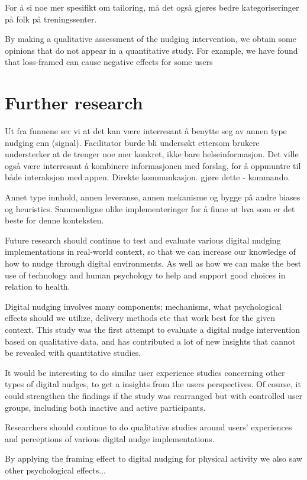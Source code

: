 For å si noe mer spesifikt om tailoring, må det også gjøres bedre kategoriseringer på folk på treningssenter. 

By making a qualitative assessment of the nudging intervention, we obtain some opinions that do not appear in a quantitative study. For example, we have found that loss-framed can cause negative effects for some users

\section{Further research}
Ut fra funnene ser vi at det kan være interresant å benytte seg av annen type nudging enn (signal). Facilitator burde bli undersøkt ettersom brukere understerker at de trenger noe mer konkret, ikke bare helseinformasjon. 
Det ville også være interresant å kombinere informasjonen med forslag, for å oppmuntre til både interaksjon med appen. Direkte kommunkasjon. gjøre dette - kommando. 

Annet type innhold, annen leveranse, annen mekanisme og bygge på andre biases og heuristics. 
Sammenligne ulike implementeringer for å finne ut hva som er det beste for denne konteksten. 

Future research should continue to test and evaluate various digital nudging implementations in real-world context, so that we can increase our knowledge of how to nudge through digital environments. As well as how we can make the best use of technology and human psychology to help and support good choices in relation to health. 

Digital nudging involves many components; mechanisms, what psychological effects should we utilize, delivery methods etc that work best for the given context. This study was the first attempt to evaluate a digital nudge intervention based on qualitative data, and has contributed a lot of new insights that cannot be revealed with quantitative studies.

It would be interesting to do similar user experience studies concerning other types of digital nudges, to get a insights from the users perspectives. Of course, it could strengthen the findings if the study was rearranged but with controlled user groups, including both inactive and active participants.   

Researchers should continue to do qualitative studies around users' experiences and perceptions of various digital nudge implementations. 

By applying the framing effect to digital nudging for physical activity we also saw other psychological effects... 

